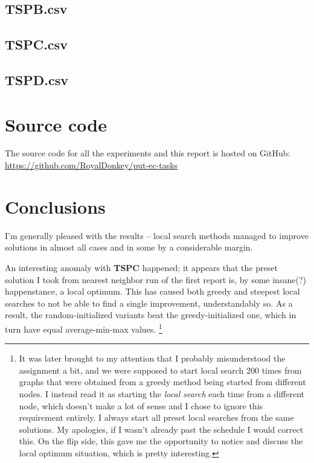 \documentclass[14pt]{article}
\begin{document}
\subsection{TSPB.csv}

\subsection{TSPC.csv}

\subsection{TSPD.csv}

\newpage
\section{Source code}
The source code for all the experiments and this report is hosted on GitHub: \\
\url{https://github.com/RoyalDonkey/put-ec-tasks}

\section{Conclusions}
I'm generally pleased with the results -- local search methods managed to
improve solutions in almost all cases and in some by a considerable margin.

An interesting anomaly with \textbf{TSPC} happened; it appears that the preset
solution I took from nearest neighbor run of the first report is, by some
insane(?) happenstance, a local optimum. This has caused both greedy and
steepest local searches to not be able to find a single improvement,
understandably so. As a result, the random-initialized variants beat the
greedy-initialized one, which in turn have equal average-min-max values.%
\footnote{It was later brought to my attention that I probably misunderstood
	the assignment a bit, and we were supposed to start local search 200 times
	from graphs that were obtained from a greedy method being started from
	different nodes. I instead read it as starting the \emph{local search} each
	time from a different node, which doesn't make a lot of sense and I chose
	to ignore this requirement entirely. I always start all preset local
	searches from the same solutions. My apologies, if I wasn't already past
	the schedule I would correct this. On the flip side, this gave me the
opportunity to notice and discuss the local optimum situation, which is pretty
interesting.}
\end{document}
